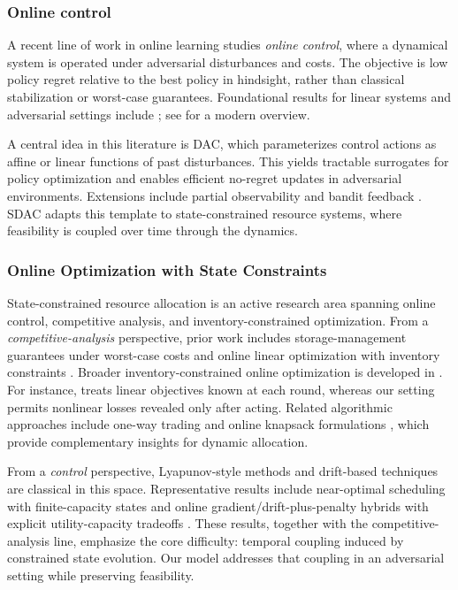 \documentclass[11pt]{article}
\begin{document}
\subsubsection{Online control}

A recent line of work in online learning studies \emph{online control}, where a dynamical system is operated under adversarial disturbances and costs. The objective is low policy regret relative to the best policy in hindsight, rather than classical stabilization or worst-case guarantees. Foundational results for linear systems and adversarial settings include \cite{agarwal2019online, agarwal2019logarithmic, hazan2020nonstochasticBandit, simchowitz2020improper}; see \cite{hazan_introduction_2025} for a modern overview.

A central idea in this literature is DAC, which parameterizes control actions as affine or linear functions of past disturbances. This yields tractable surrogates for policy optimization and enables efficient no-regret updates in adversarial environments. Extensions include partial observability \cite{lale2020logarithmic} and bandit feedback \cite{hazan2020nonstochasticBandit}. SDAC adapts this template to state-constrained resource systems, where feasibility is coupled over time through the dynamics.

\subsubsection{Online Optimization with State Constraints}

State-constrained resource allocation is an active research area spanning online control, competitive analysis, and inventory-constrained optimization. From a \emph{competitive-analysis} perspective, prior work includes storage-management guarantees under worst-case costs \cite{Chau2016} and online linear optimization with inventory constraints \cite{Yang2020}. Broader inventory-constrained online optimization is developed in \cite{yang2020online,lin2019competitive,chau2016cost,neely-inventory-control-cdc2010}. For instance, \cite{yang2020online} treats linear objectives known at each round, whereas our setting permits nonlinear losses revealed only after acting. Related algorithmic approaches include one-way trading and online knapsack formulations \cite{cao2020optimal,el2001optimal}, which provide complementary insights for dynamic allocation.

From a \emph{control} perspective, Lyapunov-style methods and drift-based techniques are classical in this space. Representative results include near-optimal scheduling with finite-capacity states \cite{Huang2013} and online gradient/drift-plus-penalty hybrids with explicit utility-capacity tradeoffs \cite{Yu2019}. These results, together with the competitive-analysis line, emphasize the core difficulty: temporal coupling induced by constrained state evolution. Our model addresses that coupling in an adversarial setting while preserving feasibility.
\end{document}
